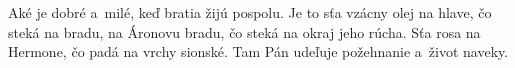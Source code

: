 Aké je dobré a~milé,
keď bratia žijú pospolu.
\versseparator
Je to sťa vzácny olej na hlave,
čo steká na bradu, na Áronovu bradu,
\versseparator
čo steká na okraj jeho rúcha.
Sťa rosa na Hermone, čo padá na vrchy sionské.
\versseparator
Tam Pán udeľuje požehnanie
a~život naveky.
